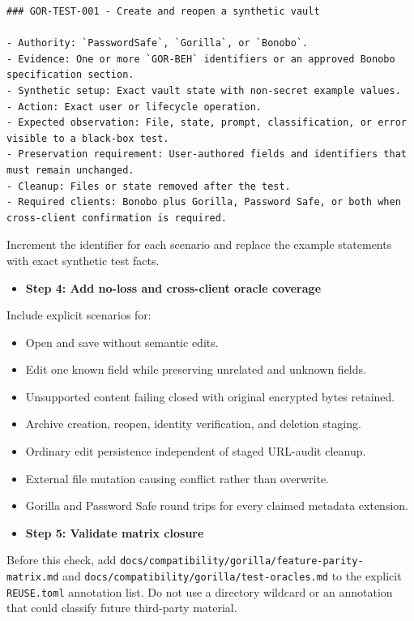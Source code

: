 \documentclass[
  letterpaper,
]{article}
\providecommand{\tightlist}{%
  \setlength{\itemsep}{0pt}\setlength{\parskip}{0pt}}
\begin{document}
\begin{lstlisting}
### GOR-TEST-001 - Create and reopen a synthetic vault

- Authority: `PasswordSafe`, `Gorilla`, or `Bonobo`.
- Evidence: One or more `GOR-BEH` identifiers or an approved Bonobo specification section.
- Synthetic setup: Exact vault state with non-secret example values.
- Action: Exact user or lifecycle operation.
- Expected observation: File, state, prompt, classification, or error visible to a black-box test.
- Preservation requirement: User-authored fields and identifiers that must remain unchanged.
- Cleanup: Files or state removed after the test.
- Required clients: Bonobo plus Gorilla, Password Safe, or both when cross-client confirmation is required.
\end{lstlisting}

Increment the identifier for each scenario and replace the example statements with exact synthetic test facts.

\begin{itemize}
\tightlist
\item[$\boxtimes$]
  \textbf{Step 4: Add no-loss and cross-client oracle coverage}
\end{itemize}

Include explicit scenarios for:

\begin{itemize}
\tightlist
\item
  Open and save without semantic edits.
\item
  Edit one known field while preserving unrelated and unknown fields.
\item
  Unsupported content failing closed with original encrypted bytes retained.
\item
  Archive creation, reopen, identity verification, and deletion staging.
\item
  Ordinary edit persistence independent of staged URL-audit cleanup.
\item
  External file mutation causing conflict rather than overwrite.
\item
  Gorilla and Password Safe round trips for every claimed metadata extension.
\end{itemize}

\begin{itemize}
\tightlist
\item[$\boxtimes$]
  \textbf{Step 5: Validate matrix closure}
\end{itemize}

Before this check, add \nolinkurl{docs/compatibility/gorilla/feature-parity-matrix.md} and
\nolinkurl{docs/compatibility/gorilla/test-oracles.md} to the explicit \nolinkurl{REUSE.toml} annotation list. Do not
use a directory wildcard or an annotation that could classify future third-party material.
\end{document}
